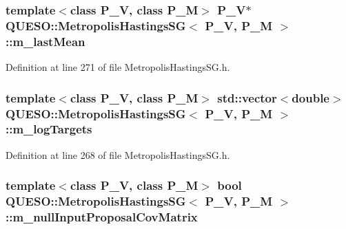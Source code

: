\hypertarget{class_q_u_e_s_o_1_1_metropolis_hastings_s_g_a9741f56d947e9d7967af91c6ea083b56}{
\subsubsection[{m\-\_\-last\-Mean}]{\setlength{\rightskip}{0pt plus 5cm}template$<$class P\-\_\-\-V, class P\-\_\-\-M$>$ P\-\_\-\-V$\ast$ {\bf Q\-U\-E\-S\-O\-::\-Metropolis\-Hastings\-S\-G}$<$ P\-\_\-\-V, P\-\_\-\-M $>$\-::m\-\_\-last\-Mean\hspace{0.3cm}{\ttfamily [private]}}}\label{class_q_u_e_s_o_1_1_metropolis_hastings_s_g_a9741f56d947e9d7967af91c6ea083b56}


Definition at line 271 of file Metropolis\-Hastings\-S\-G.\-h.

\hypertarget{class_q_u_e_s_o_1_1_metropolis_hastings_s_g_ac33a6e46e05c20c071a46ecf58a9291c}{
\subsubsection[{m\-\_\-log\-Targets}]{\setlength{\rightskip}{0pt plus 5cm}template$<$class P\-\_\-\-V, class P\-\_\-\-M$>$ std\-::vector$<$double$>$ {\bf Q\-U\-E\-S\-O\-::\-Metropolis\-Hastings\-S\-G}$<$ P\-\_\-\-V, P\-\_\-\-M $>$\-::m\-\_\-log\-Targets\hspace{0.3cm}{\ttfamily [private]}}}\label{class_q_u_e_s_o_1_1_metropolis_hastings_s_g_ac33a6e46e05c20c071a46ecf58a9291c}


Definition at line 268 of file Metropolis\-Hastings\-S\-G.\-h.

\hypertarget{class_q_u_e_s_o_1_1_metropolis_hastings_s_g_a416c5ed0c8520d23a479d4a6d3c3c083}{
\subsubsection[{m\-\_\-null\-Input\-Proposal\-Cov\-Matrix}]{\setlength{\rightskip}{0pt plus 5cm}template$<$class P\-\_\-\-V, class P\-\_\-\-M$>$ bool {\bf Q\-U\-E\-S\-O\-::\-Metropolis\-Hastings\-S\-G}$<$ P\-\_\-\-V, P\-\_\-\-M $>$\-::m\-\_\-null\-Input\-Proposal\-Cov\-Matrix\hspace{0.3cm}{\ttfamily [private]}}}\label{class_q_u_e_s_o_1_1_metropolis_hastings_s_g_a416c5ed0c8520d23a479d4a6d3c3c083}



